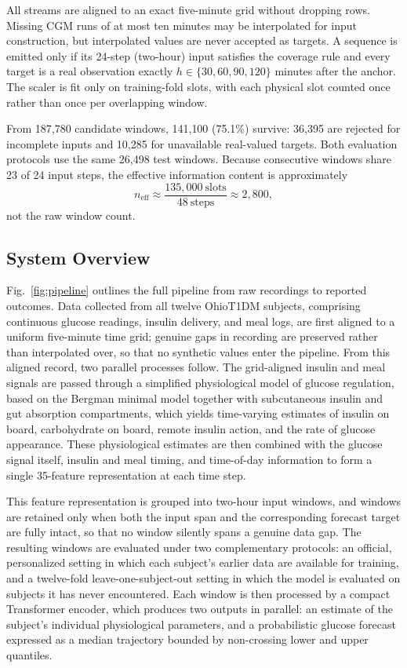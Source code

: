 \documentclass[journal]{IEEEtran}
\begin{document}
All streams are aligned to an exact five-minute grid without dropping rows. Missing CGM runs of at most ten minutes may be interpolated for input construction, but interpolated values are never accepted as targets. A sequence is emitted only if its 24-step (two-hour) input satisfies the coverage rule and every target is a real observation exactly $h \in \{30, 60, 90, 120\}$ minutes after the anchor. The scaler is fit only on training-fold slots, with each physical slot counted once rather than once per overlapping window.

From 187,780 candidate windows, 141,100 (75.1\%) survive: 36,395 are rejected for incomplete inputs and 10,285 for unavailable real-valued targets. Both evaluation protocols use the same 26,498 test windows. Because consecutive windows share 23 of 24 input steps, the effective information content is approximately
\begin{equation}
n_{\text{eff}} \approx \frac{135{,}000\ \text{slots}}{48\ \text{steps}} \approx 2{,}800,
\label{eq:neff}
\end{equation}
not the raw window count.

\subsection{System Overview}

Fig.~\ref{fig:pipeline} outlines the full pipeline from raw recordings to reported outcomes. Data collected from all twelve OhioT1DM subjects, comprising continuous glucose readings, insulin delivery, and meal logs, are first aligned to a uniform five-minute time grid; genuine gaps in recording are preserved rather than interpolated over, so that no synthetic values enter the pipeline. From this aligned record, two parallel processes follow. The grid-aligned insulin and meal signals are passed through a simplified physiological model of glucose regulation, based on the Bergman minimal model together with subcutaneous insulin and gut absorption compartments, which yields time-varying estimates of insulin on board, carbohydrate on board, remote insulin action, and the rate of glucose appearance. These physiological estimates are then combined with the glucose signal itself, insulin and meal timing, and time-of-day information to form a single 35-feature representation at each time step.

This feature representation is grouped into two-hour input windows, and windows are retained only when both the input span and the corresponding forecast target are fully intact, so that no window silently spans a genuine data gap. The resulting windows are evaluated under two complementary protocols: an official, personalized setting in which each subject's earlier data are available for training, and a twelve-fold leave-one-subject-out setting in which the model is evaluated on subjects it has never encountered. Each window is then processed by a compact Transformer encoder, which produces two outputs in parallel: an estimate of the subject's individual physiological parameters, and a probabilistic glucose forecast expressed as a median trajectory bounded by non-crossing lower and upper quantiles.
\end{document}

